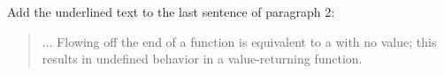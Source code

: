 Add the underlined text to the last sentence of paragraph 2:

\begin{quote}
  \pnum ... Flowing off the end of a function  is equivalent to a  with no value; this results in
  undefined behavior in a value-returning function.
\end{quote}


%

%
%
